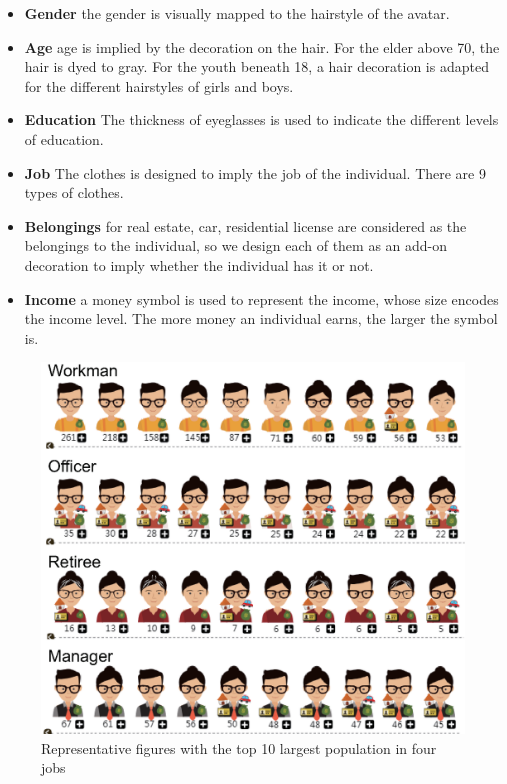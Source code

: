

\begin{itemize}
\item \textbf{Gender} the gender is visually mapped to the hairstyle of the avatar.
\item \textbf{Age} age is implied by the decoration on the hair. For the elder above 70, the hair is dyed to gray. For the youth beneath 18, a hair decoration is adapted for the different hairstyles of girls and boys.
\item \textbf{Education} The thickness of eyeglasses is used to indicate the different levels of education.
\item \textbf{Job} The clothes is designed to imply the job of the individual. There are 9 types of clothes.
\item \textbf{Belongings} for real estate, car, residential license are considered as the belongings to the individual, so we design each of them as an add-on decoration to imply whether the individual has it or not.
\item \textbf{Income} a money symbol is used to represent the income, whose size encodes the income level. The more money an individual earns, the larger the symbol is.
\end{itemize}

\begin{figure}[htb!]
 \centering %
 \includegraphics[width=0.6\columnwidth]{pictures/design_example}
 \caption{Representative figures with the top 10 largest population in four jobs}
 \label{fig:div_example}
\end{figure}


